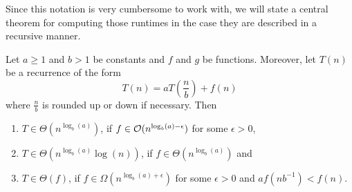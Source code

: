     Since this notation is very cumbersome to work with, we will state a central theorem for computing those runtimes in the case they are described in a recursive manner.
    \begin{theorem} 
        Let $a \geq 1$ and $b > 1$ be constants and $f$ and $g$ be functions. Moreover, let $T(n)$ be a recurrence of the form
        \begin{equation*}
            T(n) = a T\left(\frac{n}{b}\right) + f(n)
        \end{equation*}
        where $\frac{n}{b}$ is rounded up or down if necessary. Then 
        \begin{enumerate}[label=(\roman*)]
            \item $T \in \Theta(n^{\log_b(a)})$, if $f \in \mathcal{O}(n^{\log_b(a) - \epsilon})$ for some $\epsilon > 0$,
            
            \item $T \in \Theta(n^{\log_b(a)}\log(n))$, if $f \in \Theta(n^{\log_b(a)})$ and
            
            \item $T \in \Theta(f)$, if $f \in \Omega(n^{\log_b(a) + \epsilon})$ for some $\epsilon > 0$ and $af(nb^{-1}) < f(n)$.
        \end{enumerate}
    \end{theorem}

